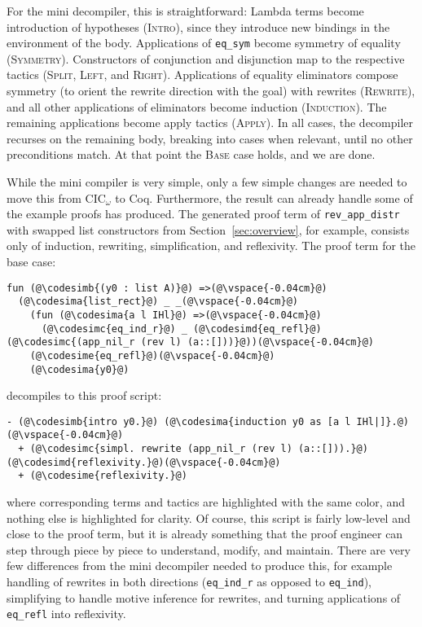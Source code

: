 For the mini decompiler, this is straightforward: Lambda terms become introduction of hypotheses (\textsc{Intro}), since they introduce new bindings
in the environment of the body. Applications of \lstinline{eq_sym} become symmetry of equality (\textsc{Symmetry}).
Constructors of conjunction and disjunction map to the respective tactics (\textsc{Split}, \textsc{Left}, and \textsc{Right}).
Applications of equality eliminators compose symmetry (to orient the rewrite direction with the goal) with rewrites (\textsc{Rewrite}),
and all other applications of eliminators become induction (\textsc{Induction}).
The remaining applications become apply tactics (\textsc{Apply}).
In all cases, the decompiler recurses on the remaining body, breaking into cases when relevant, until no other preconditions match.
At that point the \textsc{Base} case holds, and we are done.

While the mini compiler is very simple, only a few simple changes are needed
to move this from CIC$_{\omega}$ to Coq.
Furthermore, the result can already handle some of the example proofs \toolname has produced.
The generated proof term of \lstinline{rev_app_distr} with swapped list constructors from Section~\ref{sec:overview},
for example, consists only of induction, rewriting, simplification, and reflexivity.
The proof term for the base case:

\begin{lstlisting}
fun (@\codesimb{(y0 : list A)}@) =>(@\vspace{-0.04cm}@)
  (@\codesima{list_rect}@) _ _(@\vspace{-0.04cm}@)
    (fun (@\codesima{a l IHl}@) =>(@\vspace{-0.04cm}@)
      (@\codesimc{eq_ind_r}@) _ (@\codesimd{eq_refl}@) (@\codesimc{(app_nil_r (rev l) (a::[]))}@))(@\vspace{-0.04cm}@)
    (@\codesime{eq_refl}@)(@\vspace{-0.04cm}@)
    (@\codesima{y0}@)
\end{lstlisting}
decompiles to this proof script:

\begin{lstlisting}
- (@\codesimb{intro y0.}@) (@\codesima{induction y0 as [a l IHl|]}.@)(@\vspace{-0.04cm}@)
  + (@\codesimc{simpl. rewrite (app_nil_r (rev l) (a::[])).}@) (@\codesimd{reflexivity.}@)(@\vspace{-0.04cm}@)
  + (@\codesime{reflexivity.}@)
\end{lstlisting}
where corresponding terms and tactics are highlighted with the same color, and nothing else is highlighted for clarity.
Of course, this script is fairly low-level and close to the proof term, but it is already something that the proof engineer
can step through piece by piece to understand, modify, and maintain.
There are very few differences from the mini decompiler needed to produce this,
for example handling of rewrites in both directions (\lstinline{eq_ind_r} as opposed to \lstinline{eq_ind}),
simplifying to handle motive inference for rewrites,
and turning applications of \lstinline{eq_refl} into reflexivity.

